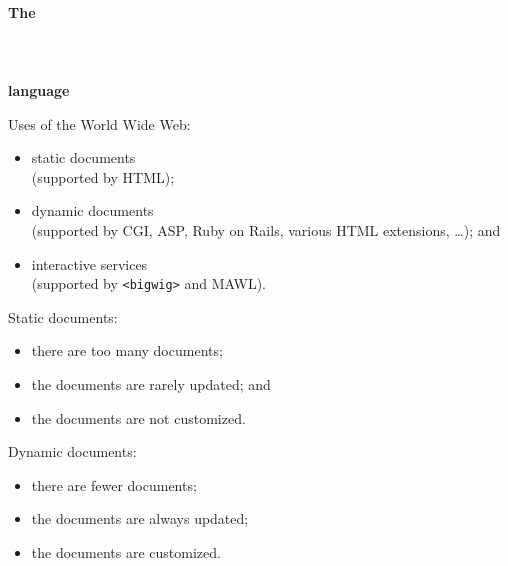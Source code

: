


 

\begin{slide*}
\begin{tabbing}
~\\
{\Huge\bf The}\\ ~\\\\ ~\\{\Huge\bf language}\\
\end{tabbing}
\vfil
\end{slide*}

\begin{slide*}
Uses of the World Wide Web:
\begin{itemize}
\item static documents\\(supported by HTML);
\item dynamic documents\\(supported by CGI, ASP, Ruby on Rails, various HTML
extensions, \ldots); and
\item interactive services\\(supported by \verb"<bigwig>" and MAWL).
\end{itemize}
\vfil
\end{slide*}
 
\begin{slide*}
Static documents:
\begin{itemize}
\item there are too many documents;
\item the documents are rarely updated; and
\item the documents are not customized.
\end{itemize}
\vspace*{2ex}

Dynamic documents:
\begin{itemize}
\item there are fewer documents;
\item the documents are always updated;
\item the documents are customized.
\end{itemize}
\vfil
\end{slide*}
 

